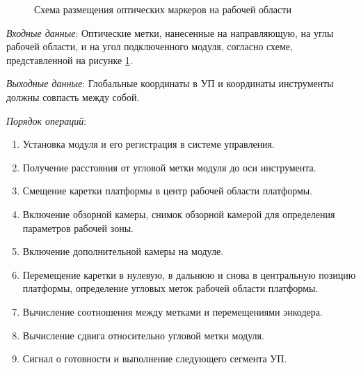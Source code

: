 \begin{figure}[ht]
	\caption{Схема размещения оптических маркеров на рабочей области}\label{fig:posit}
\end{figure}

\textit{Входные данные}: Оптические метки, нанесенные на направляющую, на углы рабочей области, и на угол подключенного модуля, согласно схеме, представленной на рисунке \cref{fig:posit}.

\textit{Выходные данные}: Глобальные координаты в УП и координаты инструменты должны совпасть между собой.

\textit{Порядок операций}:

\begin{enumerate}
	\item Установка модуля и его регистрация в системе управления.
	\item Получение расстояния от угловой метки модуля до оси инструмента.
	\item Смещение каретки платформы в центр рабочей области платформы.
	\item Включение обзорной камеры, снимок обзорной камерой для определения параметров рабочей зоны.
	\item Включение дополнительной камеры на модуле.
	\item Перемещение каретки в нулевую, в дальнюю и снова в центральную позицию платформы, определение угловых меток рабочей области платформы.
	\item Вычисление соотношения между метками и перемещениями энкодера.
	\item Вычисление сдвига относительно угловой метки модуля.
	\item Сигнал о готовности и выполнение следующего сегмента УП.
\end{enumerate}

